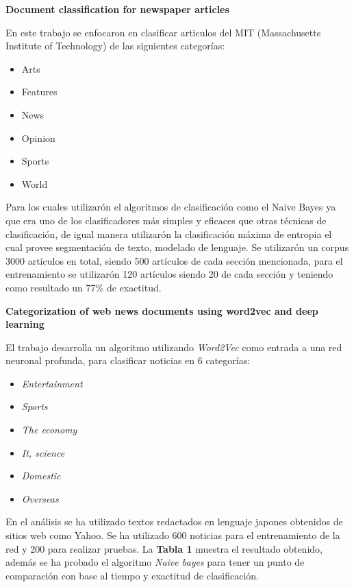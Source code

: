 \begin{large}
	 \textbf{Document classification for newspaper articles}\\
\end{large}

En este trabajo se enfocaron en clasificar articulos del MIT (Massachusetts Institute of Technology) de las siguientes categorías:

	\begin{itemize}
		\item Arts
		\item Features
		\item News
		\item Opinion
		\item Sports
		\item World
	\end{itemize}
Para los cuales utilizarón el algoritmos de clasificación como el Naive Bayes ya que era uno de los clasificadores más simples y eficaces que otras técnicas de clasificación, de igual manera utilizarón la clasificación máxima de entropia el cual provee segmentación de texto, modelado de lenguaje.
Se utilizarón un corpus 3000 artículos en total, siendo 500 artículos de cada sección mencionada, para el entrenamiento se utilizarón 120 artículos siendo 20 de cada sección y teniendo como resultado un 77\% de exactitud\cite{siete}.\\

\begin{large}
	 \textbf{Categorization of web news documents using word2vec and deep learning}\\
\end{large}

El trabajo desarrolla un algoritmo utilizando \textit{Word2Vec} como entrada a una red neuronal profunda, para clasificar noticias en 6 categorías:

\begin{itemize}
 
 	\item \textit{Entertainment} 
 	\item \textit{Sports}
 	\item \textit{The economy}
 	\item \textit{It, science}
 	\item \textit{Domestic} 
 	\item \textit{Overseas}

\end{itemize}

 En el análisis se ha utilizado textos redactados en lenguaje japones obtenidos de sitios web como Yahoo. Se ha utilizado 600 noticias para el entrenamiento de la red y 200 para realizar pruebas. La \textbf{Tabla 1} muestra el resultado obtenido, además se ha probado el algoritmo \textit{Naive bayes} para tener un punto de comparación con base al tiempo y exactitud de clasificación.\\

